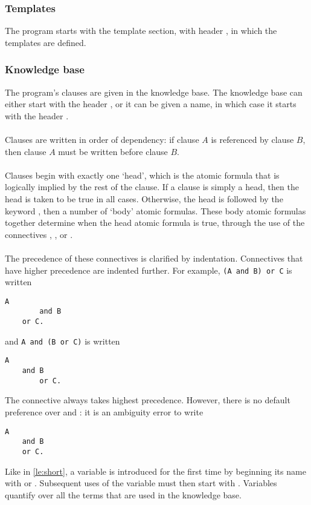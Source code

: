 \documentclass[../main.tex]{subfiles}
\begin{document}
\subsubsection{Templates}
The program starts with the template section, with header , in which the templates are defined. 

\subsubsection{Knowledge base}
The program's clauses are given in the knowledge base. The knowledge base can either start with the header , or it can be given a name, in which case it starts with the header . 
\\
\\
Clauses are written in order of dependency: if clause $A$ is referenced by clause $B$, then clause $A$ must be written before clause $B$.
\\ 
\\
Clauses begin with exactly one `head', which is the atomic formula that is logically implied by the rest of the clause. If a clause is simply a head, then the head is taken to be true in all cases. Otherwise, the head is followed by the keyword , then a number of `body' atomic formulas. These body atomic formulas together determine when the head atomic formula is true, through the use of the connectives , , or .
\\ 
\\
The precedence of these connectives is clarified by indentation. Connectives that have higher precedence are indented further. For example, \texttt{(A and B) or C} is written
\newpage
\begin{lstlisting}[language={LE}]
    A
        and B
    or C.
\end{lstlisting}
and \texttt{A and (B or C)} is written
\begin{lstlisting}[language={LE}]
    A
    and B
        or C.
\end{lstlisting}
The connective  always takes highest precedence. However, there is no default preference over  and : it is an ambiguity error to write
\begin{lstlisting}[language={LE}]
    A 
    and B
    or C.
\end{lstlisting}
Like in \ref{le:short}, a variable is introduced for the first time by beginning its name with  or .  Subsequent uses of the variable must then start with . Variables quantify over all the terms that are used in the knowledge base.
\end{document}
